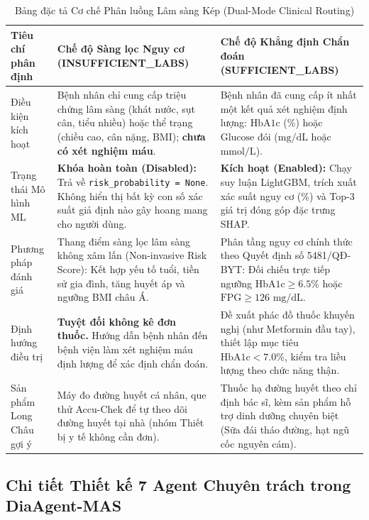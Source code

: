 \documentclass[12pt,a4paper]{article}
\begin{document}
\begin{table}[H]
\centering
\footnotesize
\caption{Bảng đặc tả Cơ chế Phân luồng Lâm sàng Kép (Dual-Mode Clinical Routing)}
\label{tab:dual_mode}
\begin{tabularx}{\textwidth}{@{} l Y Y @{}}
\toprule
\textbf{Tiêu chí phân định} & \textbf{Chế độ Sàng lọc Nguy cơ (INSUFFICIENT\_LABS)} & \textbf{Chế độ Khẳng định Chẩn đoán (SUFFICIENT\_LABS)} \\
\midrule
Điều kiện kích hoạt & Bệnh nhân chỉ cung cấp triệu chứng lâm sàng (khát nước, sụt cân, tiểu nhiều) hoặc thể trạng (chiều cao, cân nặng, BMI); \textbf{chưa có xét nghiệm máu}. & Bệnh nhân đã cung cấp ít nhất một kết quả xét nghiệm định lượng: $\text{HbA1c}$ (\%) hoặc $\text{Glucose}$ đói ($\text{mg/dL}$ hoặc $\text{mmol/L}$). \\
Trạng thái Mô hình ML & \textbf{Khóa hoàn toàn (Disabled):} Trả về \texttt{risk\_probability = None}. Không hiển thị bất kỳ con số xác suất giả định nào gây hoang mang cho người dùng. & \textbf{Kích hoạt (Enabled):} Chạy suy luận LightGBM, trích xuất xác suất nguy cơ (\%) và Top-3 giá trị đóng góp đặc trưng SHAP. \\
Phương pháp đánh giá & Thang điểm sàng lọc lâm sàng không xâm lấn (Non-invasive Risk Score): Kết hợp yếu tố tuổi, tiền sử gia đình, tăng huyết áp và ngưỡng BMI châu Á. & Phân tầng nguy cơ chính thức theo Quyết định số 5481/QĐ-BYT: Đối chiếu trực tiếp ngưỡng $\text{HbA1c} \ge 6.5\%$ hoặc $\text{FPG} \ge 126\text{ mg/dL}$. \\
Định hướng điều trị & \textbf{Tuyệt đối không kê đơn thuốc.} Hướng dẫn bệnh nhân đến bệnh viện làm xét nghiệm máu định lượng để xác định chẩn đoán. & Đề xuất phác đồ thuốc khuyến nghị (như Metformin đầu tay), thiết lập mục tiêu $\text{HbA1c} < 7.0\%$, kiểm tra liều lượng theo chức năng thận. \\
Sản phẩm Long Châu gợi ý & Máy đo đường huyết cá nhân, que thử Accu-Chek để tự theo dõi đường huyết tại nhà (nhóm Thiết bị y tế không cần đơn). & Thuốc hạ đường huyết theo chỉ định bác sĩ, kèm sản phẩm hỗ trợ dinh dưỡng chuyên biệt (Sữa đái tháo đường, hạt ngũ cốc nguyên cám). \\
\bottomrule
\end{tabularx}
\end{table}

\subsection{Chi tiết Thiết kế 7 Agent Chuyên trách trong DiaAgent-MAS}
\end{document}
